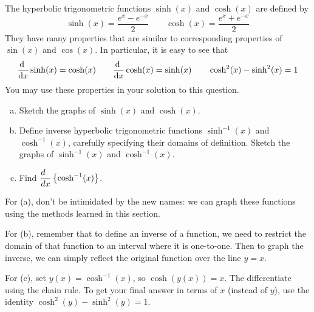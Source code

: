 \begin{question}[2012H]
The hyperbolic trigonometric functions $\sinh(x)$ and
$\cosh(x)$ are defined by
$$
\sinh(x)=\dfrac{e^x-e^{-x}}{2}\qquad
\cosh(x)=\dfrac{e^x+e^{-x}}{2}
$$
They have many properties that are similar to corresponding properties
of $\sin(x)$ and $\cos(x)$. In particular, it is easy to see that
$$
\diff{}{x} \sinh(x)=\cosh(x)\qquad
\diff{}{x} \cosh(x)=\sinh(x)\qquad
\cosh^2(x)-\sinh^2(x)=1
$$
You may use these properties in your solution to this question.
\begin{enumerate}[(a)]
\item Sketch the graphs of $\sinh(x)$ and $\cosh(x)$.
\item Define inverse hyperbolic trigonometric functions
$\sinh^{-1}(x)$ and $\cosh^{-1}(x)$, carefully specifying their domains
of definition. Sketch the graphs of $\sinh^{-1}(x)$ and $\cosh^{-1}(x)$.
\item Find
$
\dfrac{d\hfill}{dx}\left\{ \cosh^{-1}(x)\right\}
$.
\end{enumerate}
\end{question}
\begin{hint}
For (a), don't be intimidated by the new names: we can graph these functions using the methods learned in this section.

For (b), remember that to define an inverse of a function, we need to restrict the domain of that function to an interval where it is one-to-one. Then to graph the inverse, we can simply reflect the original function over the line $y=x$.

For (c), set $y(x)=\cosh^{-1}(x)$, so $\cosh(y(x))=x$. The differentiate using the chain rule. To get your final answer in terms of $x$ (instead of $y$), use the identity $\cosh^2(y)-\sinh^2(y)=1$.
\end{hint}

